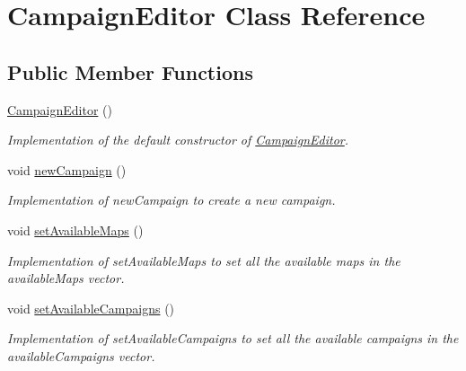 \hypertarget{class_campaign_editor}{}\section{Campaign\+Editor Class Reference}
\label{class_campaign_editor}
\subsection*{Public Member Functions}
\begin{DoxyCompactItemize}
\item 
\hypertarget{class_campaign_editor_a1f9e45e60a19fb2372d38a9a9f0dd745}{}\label{class_campaign_editor_a1f9e45e60a19fb2372d38a9a9f0dd745} 
\hyperlink{class_campaign_editor_a1f9e45e60a19fb2372d38a9a9f0dd745}{Campaign\+Editor} ()
\begin{DoxyCompactList}\small\item\em Implementation of the default constructor of \hyperlink{class_campaign_editor}{Campaign\+Editor}. \end{DoxyCompactList}\item 
\hypertarget{class_campaign_editor_a1d734e04cf258ab8b3d51f83f471334e}{}\label{class_campaign_editor_a1d734e04cf258ab8b3d51f83f471334e} 
void \hyperlink{class_campaign_editor_a1d734e04cf258ab8b3d51f83f471334e}{new\+Campaign} ()
\begin{DoxyCompactList}\small\item\em Implementation of new\+Campaign to create a new campaign. \end{DoxyCompactList}\item 
\hypertarget{class_campaign_editor_aeef9c6befce9bf6702c5118c1317feb0}{}\label{class_campaign_editor_aeef9c6befce9bf6702c5118c1317feb0} 
void \hyperlink{class_campaign_editor_aeef9c6befce9bf6702c5118c1317feb0}{set\+Available\+Maps} ()
\begin{DoxyCompactList}\small\item\em Implementation of set\+Available\+Maps to set all the available maps in the available\+Maps vector. \end{DoxyCompactList}\item 
\hypertarget{class_campaign_editor_a07ca1759b2e1b0a05566a19a73db26de}{}\label{class_campaign_editor_a07ca1759b2e1b0a05566a19a73db26de} 
void \hyperlink{class_campaign_editor_a07ca1759b2e1b0a05566a19a73db26de}{set\+Available\+Campaigns} ()
\begin{DoxyCompactList}\small\item\em Implementation of set\+Available\+Campaigns to set all the available campaigns in the available\+Campaigns vector. \end{DoxyCompactList}\item 

\end{DoxyCompactItemize}
